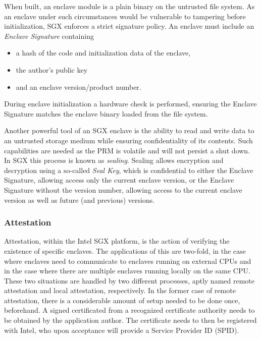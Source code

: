 \documentclass[12pt]{article}
\begin{document}
      When built, an enclave module is a plain binary on the untrusted file system.
      As an enclave under such circumstances would be vulnerable to tampering before initialization, SGX enforces a strict signature policy.
      An enclave must include an \textit{Enclave Signature} containing
      \begin{itemize}
        \item a hash of the code and initialization data of the enclave,
        \item the author's public key
        \item and an enclave version/product number.
      \end{itemize}
      During enclave initialization a hardware check is performed, ensuring the Enclave Signature matches the enclave binary loaded from the file system.

      Another powerful tool of an SGX enclave is the ability to read and write data to an untrusted storage medium while ensuring confidentiality of its contents.
      Such capabilities are needed as the PRM is volatile and will not persist a shut down.
      In SGX this process is known as \textit{sealing}.
      Sealing allows encryption and decryption using a so-called \textit{Seal Key}, which is confidential to either the Enclave Signature, allowing access only the current enclave version, or the Enclave Signature without the version number, allowing access to the current enclave version as well as future (and previous) versions.

			\subsubsection{Attestation}
			Attestation, within the Intel SGX platform, is the action of verifying the existence of specific enclaves.
			The applications of this are two-fold, in the case where enclaves need to communicate to enclaves running on external CPUs and in the case where there are multiple enclaves running locally on the same CPU.
			These two situations are handled by two different processes, aptly named remote attestation and local attestation, respectively.
			In the former case of remote attestation, there is a considerable amount of setup needed to be done once, beforehand.
			A signed certificated from a recognized certificate authority needs to be obtained by the application author.
			The certificate needs to then be registered with Intel, who upon acceptance will provide a Service Provider ID (SPID).
\end{document}
